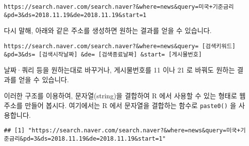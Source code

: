 \documentclass[]{article}
\newenvironment{Shaded}{\begin{snugshade}}{\end{snugshade}}
\newcommand{\CommentTok}[1]{\textcolor[rgb]{0.56,0.35,0.01}{\textit{#1}}}
\newcommand{\DataTypeTok}[1]{\textcolor[rgb]{0.13,0.29,0.53}{#1}}
\newcommand{\DecValTok}[1]{\textcolor[rgb]{0.00,0.00,0.81}{#1}}
\newcommand{\KeywordTok}[1]{\textcolor[rgb]{0.13,0.29,0.53}{\textbf{#1}}}
\newcommand{\NormalTok}[1]{#1}
\newcommand{\StringTok}[1]{\textcolor[rgb]{0.31,0.60,0.02}{#1}}
\begin{document}
\begin{verbatim}
https://search.naver.com/search.naver?&where=news&query=미국+기준금리&pd=3&ds=2018.11.19&de=2018.11.19&start=1
\end{verbatim}

다시 말해, 아래와 같은 주소를 생성하면 원하는 결과를 얻을 수 있습니다.

\begin{verbatim}
https://search.naver.com/search.naver?&where=news&query= [검색키워드] &pd=3&ds= [검색시작날짜] &de= [검색종료날짜] &start= [게시물번호]
\end{verbatim}

날짜·쿼리 등을 원하는대로 바꾸거나, 게시물번호를 11 이나 21 로 바꿔도
원하는 결과를 얻을 수 있습니다.

이러한 구조를 이용하여, 문자열(string)을 결합하여 R 에서 사용할 수 있는
형태로 웹 주소를 만들어 봅시다. 여기에서는 R 에서 문자열을 결합하는
함수로 \texttt{paste0()} 을 사용합니다.

\begin{Shaded}
\end{Shaded}

\begin{verbatim}
## [1] "https://search.naver.com/search.naver?&where=news&query=미국+기준금리&pd=3&ds=2018.11.19&de=2018.11.19&start=1"
\end{verbatim}
\end{document}
